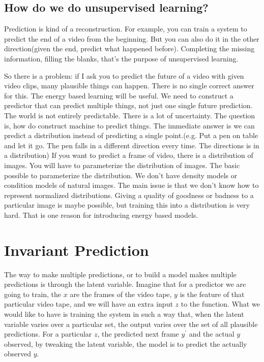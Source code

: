 \subsection{How do we do unsupervised learning?}

Prediction is kind of a reconstruction. For example, you can train a system to predict the end of a video from the beginning. But you can also do it in the other direction(given the end, predict what happened before). Completing the missing information, filling the blanks, that's the purpose of unsupervised learning.

So there is a problem: if I ask you to predict the future of a video with given video clips, many plausible things can happen. There is no single correct answer for this. The energy based learning will be useful. We need to construct a predictor that can predict multiple things, not just one single future prediction. The world is not entirely predictable. There is a lot of uncertainty. The question is, how do construct machine to predict things. The immediate answer is we can predict a distribution instead of predicting a single point.(e.g. Put a pen on table and let it go. The pen falls in a different direction every time. The directions is in a distribution) If you want to predict a frame of video, there is a distribution of images. You will have to parameterize the distribution of images. The basic possible to parameterize the distribution. We don't have density models or condition models of natural images. The main issue is that we don't know how to represent normalized distributions. Giving a quality of goodness or badness to a particular image is maybe possible, but training this into a distribution is very hard. That is one reason for introducing energy based models.

\section{Invariant Prediction}

The way to make multiple predictions, or to build a model makes multiple predictions is through the latent variable. Imagine that for a predictor we are going to train, the $x$ are the frames of the video tape, $y$ is the feature of that particular video tape, and we will have an extra input $z$ to the function. What we would like to have is training the system in such a way that, when the latent variable varies over a particular set, the output varies over the set of all plausible predictions. For a particular $z$, the predicted next frame $y^\prime$ and the actual $y$ observed, by tweaking the latent variable, the model is to predict the actually observed $y$.

